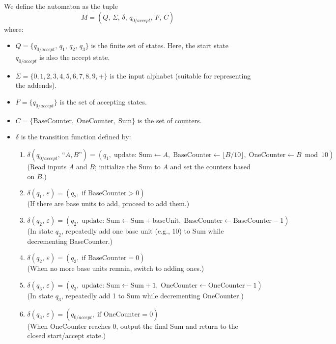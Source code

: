 \documentclass[11pt]{article}
\begin{document}
We define the automaton as the tuple
\[
M = (Q,\,\Sigma,\,\delta,\,q_{0/accept},\,F,\,C)
\]
where:
\begin{itemize}
    \item \(Q = \{q_{0/accept},\, q_1,\, q_2,\, q_3\}\) is the finite set of states. Here, the start state \(q_{0/accept}\) is also the accept state.
    \item \(\Sigma = \{0,1,2,3,4,5,6,7,8,9,+\}\) is the input alphabet (suitable for representing the addends).
    \item \(F = \{q_{0/accept}\}\) is the set of accepting states.
    \item \(C = \{\text{BaseCounter},\; \text{OneCounter},\; \text{Sum}\}\) is the set of counters.
    \item \(\delta\) is the transition function defined by:
    \begin{enumerate}
        \item \(\delta(q_{0/accept},\, \text{``}A,B\text{''}) = (q_1,\; \text{update: } \text{Sum} \gets A,\; \text{BaseCounter} \gets \lfloor B/10 \rfloor,\; \text{OneCounter} \gets B \bmod 10 )\) \\
              (Read inputs \(A\) and \(B\); initialize the Sum to \(A\) and set the counters based on \(B\).)
        \item \(\delta(q_1,\, \varepsilon) = (q_2,\; \text{if BaseCounter} > 0)\) \\
              (If there are base units to add, proceed to add them.)
        \item \(\delta(q_2,\, \varepsilon) = (q_2,\; \text{update: } \text{Sum} \gets \text{Sum} + \text{baseUnit},\; \text{BaseCounter} \gets \text{BaseCounter} - 1)\) \\
              (In state \(q_2\), repeatedly add one base unit (e.g., 10) to Sum while decrementing BaseCounter.)
        \item \(\delta(q_2,\, \varepsilon) = (q_3,\; \text{if BaseCounter} = 0)\) \\
              (When no more base units remain, switch to adding ones.)
        \item \(\delta(q_3,\, \varepsilon) = (q_3,\; \text{update: } \text{Sum} \gets \text{Sum} + 1,\; \text{OneCounter} \gets \text{OneCounter} - 1)\) \\
              (In state \(q_3\), repeatedly add 1 to Sum while decrementing OneCounter.)
        \item \(\delta(q_3,\, \varepsilon) = (q_{0/accept},\; \text{if OneCounter} = 0)\) \\
              (When OneCounter reaches 0, output the final Sum and return to the closed start/accept state.)
    \end{enumerate}
\end{itemize}
\end{document}

